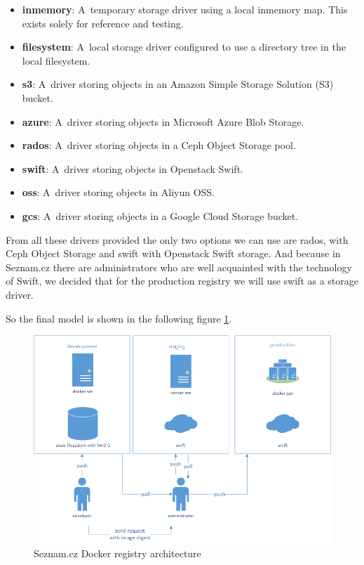 \begin{itemize}
  \item \textbf{inmemory}: A~temporary storage driver using a local inmemory map. This exists solely for reference and testing.
  \item \textbf{filesystem}: A~local storage driver configured to use a directory tree in the local filesystem.
  \item \textbf{s3}: A~driver storing objects in an Amazon Simple Storage Solution (S3) bucket.
  \item \textbf{azure}: A~driver storing objects in Microsoft Azure Blob Storage.
  \item \textbf{rados}: A~driver storing objects in a Ceph Object Storage pool.
  \item \textbf{swift}: A~driver storing objects in Openstack Swift.
  \item \textbf{oss}: A~driver storing objects in Aliyun OSS.
  \item \textbf{gcs}: A~driver storing objects in a Google Cloud Storage bucket.
\end{itemize}


From all these drivers provided the only two options we can use are rados, with Ceph Object Storage and swift with Openstack Swift storage. And because in Seznam.cz there are administrators who are well acquainted with the technology of Swift, we decided that for the production registry we will use swift as a storage driver.

So the final model is shown in the following figure \ref{fig:seznam-docker-registry}.
                
\begin{figure}[htb]\centering
  \includegraphics[width=1\textwidth]{images/registry.png}
  \caption
    {Seznam.cz Docker registry architecture}
  \label{fig:seznam-docker-registry}
\end{figure}
